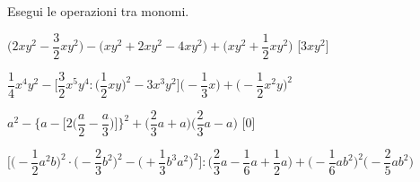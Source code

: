 \begin{esercizio}[\Ast]
 \label{ese:9.35}
Esegui le operazioni tra monomi.

\begin{enumeratea}
 \item 
$\bigg(2xy^{2}-\dfrac{3}{2}xy^{2}\bigg)-\big(xy^{2}+2xy^{2}-4xy^{2}
\big)+\bigg(xy^{2}+\dfrac{1}{2}xy^{2}\bigg)$
  \hfill[$3xy^{2}$]
 \item 
$\dfrac{1}{4}x^{4}y^{2}-\bigg[\dfrac{3}{2}x^{5}y^{4}:\bigg(\dfrac{1}{2}xy\bigg)^
{2}-3x^{3}y^{2}\bigg]%
 \bigg(-{\dfrac{1}{3}}x\bigg)+\bigg(-{\dfrac{1}{2}}x^{2}y\bigg)^{2}$
  \hfill{}
 \item 
$a^{2}-\Bigg\{a-\bigg[2\bigg(\dfrac{a}{2}-\dfrac{a}{3}\bigg)\bigg]\Bigg\}^{2}+%
 \bigg(\dfrac{2}{3}a+a\bigg)\bigg(\dfrac{2}{3}a-a\bigg)$
  \hfill[0]
 \item 
$\bigg[\bigg(-{\dfrac{1}{2}}a^{2}b\bigg)^{2}\cdot\bigg(-{\dfrac{2}{3}}b^{2}
\bigg)^{2}-%
\bigg(+{\dfrac{1}{3}}b^{3}a^{2}\bigg)^{2}\bigg]:\bigg(\dfrac{2}{3}a-\dfrac{1}{6}
a+\dfrac{1}{2}a\bigg)+\bigg(-{\dfrac{1}{6}}ab^{2}\bigg)^2%
 \bigg(-{\dfrac{2}{5}}ab^2\bigg)$
  \hfill{}%
%  
%  
%  
%  
\end{enumeratea}
\end{esercizio}


